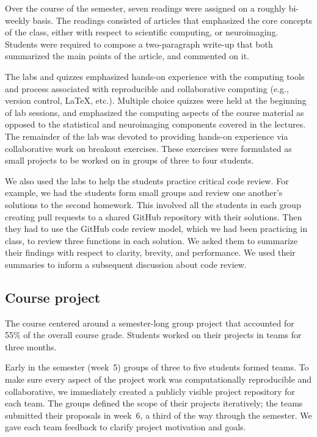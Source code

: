 Over the course of the semester, seven readings were assigned on a roughly
bi-weekly basis.
The readings consisted of articles that emphasized the core concepts
of the class, either with respect to scientific computing, or neuroimaging.
Students were required to compose a two-paragraph write-up that both summarized
the main points of the article, and commented on it.

The labs and quizzes emphasized hands-on experience with the computing tools
and process associated with reproducible and collaborative computing (e.g.,
version control, \LaTeX, etc.).
Multiple choice quizzes were held at the beginning of lab sessions, and
emphasized the computing aspects of the course material as
opposed to the statistical and neuroimaging components covered in the lectures.
The remainder of the lab was devoted to providing hands-on experience via
collaborative work on breakout exercises.
These exercises were formulated as small projects to be worked on
in groups of three to four students.

We also used the labs to help the students practice critical code review.
For example, we had the students form small groups and review one another's
solutions to the second homework.
This involved all the students in each group creating pull requests to a
shared GitHub repository with their solutions.
Then they had to use the GitHub code review model, which we had been practicing
in class, to review three functions in each solution.
We asked them to summarize their findings with respect to
clarity, brevity, and performance.
We used their summaries to inform a subsequent discussion about code review.

\subsection{Course project}\label{project}

The course centered around a semester-long group project that accounted for 55\%
of the overall course grade.
Students worked on their projects in teams for three months.

Early in the semester (week~5) groups of three to five students formed teams.
To make sure every aspect of the project work was computationally
reproducible and collaborative, we immediately created a publicly visible
project repository for each team.
The groups defined the scope of their projects iteratively; the teams
submitted their proposals in week~6, a third of the way through the semester.
We gave each team feedback to clarify project motivation and goals.

